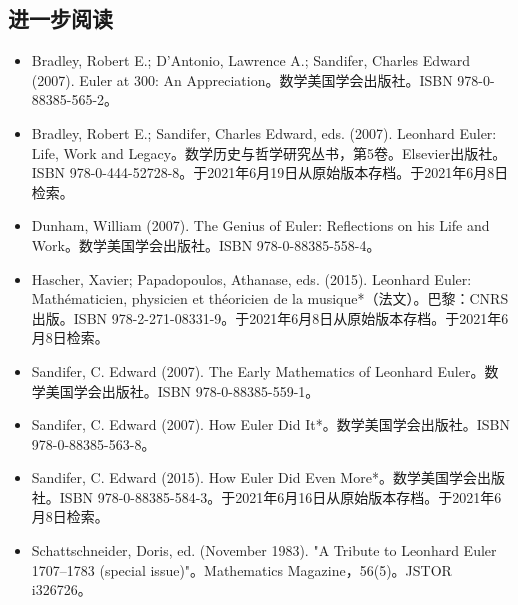 \subsection{进一步阅读}
\begin{itemize}
\item Bradley, Robert E.; D'Antonio, Lawrence A.; Sandifer, Charles Edward (2007).  
Euler at 300: An Appreciation。数学美国学会出版社。ISBN 978-0-88385-565-2。
\item Bradley, Robert E.; Sandifer, Charles Edward, eds. (2007). 
Leonhard Euler: Life, Work and Legacy。数学历史与哲学研究丛书，第5卷。Elsevier出版社。ISBN 978-0-444-52728-8。于2021年6月19日从原始版本存档。于2021年6月8日检索。
\item Dunham, William (2007).  
The Genius of Euler: Reflections on his Life and Work。数学美国学会出版社。ISBN 978-0-88385-558-4。
\item Hascher, Xavier; Papadopoulos, Athanase, eds. (2015).  
Leonhard Euler: Mathématicien, physicien et théoricien de la musique*（法文）。巴黎：CNRS出版。ISBN 978-2-271-08331-9。于2021年6月8日从原始版本存档。于2021年6月8日检索。
\item Sandifer, C. Edward (2007). 
The Early Mathematics of Leonhard Euler。数学美国学会出版社。ISBN 978-0-88385-559-1。
\item Sandifer, C. Edward (2007).  
How Euler Did It*。数学美国学会出版社。ISBN 978-0-88385-563-8。
\item Sandifer, C. Edward (2015).  
How Euler Did Even More*。数学美国学会出版社。ISBN 978-0-88385-584-3。于2021年6月16日从原始版本存档。于2021年6月8日检索。
\item Schattschneider, Doris, ed. (November 1983). 
"A Tribute to Leonhard Euler 1707–1783 (special issue)"。Mathematics Magazine，56(5)。JSTOR i326726。
\end{itemize}
